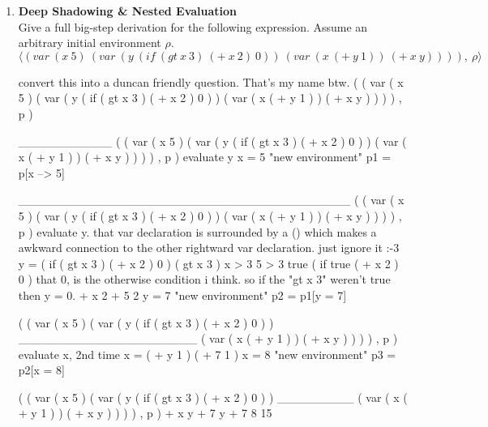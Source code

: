 \documentclass[11pt]{article}
\begin{document}
    \begin{enumerate}
        \item \textbf{Deep Shadowing \& Nested Evaluation} \\
        Give a full big-step derivation for the following expression. Assume an arbitrary initial environment $\rho$.
        \[
            \langle (var\ (x\ 5)\ (var\ (y\ (if\ (gt\ x\ 3)\ (+\ x\ 2)\ 0))\ (var\ (x\ (+\ y\ 1))\ (+\ x\ y)))),\ \rho \rangle
        \]

        \begin{markdown}
            convert this into a duncan friendly question. That's my name btw.
            ( ( var ( x 5 ) ( var ( y ( if ( gt x 3 ) ( + x 2 ) 0 ) )
            ( var ( x ( + y 1 ) ) ( + x y ) ) ) ) , p )

            ___________
            ( ( var ( x 5 ) ( var ( y ( if ( gt x 3 ) ( + x 2 ) 0 ) )
            ( var ( x ( + y 1 ) ) ( + x y ) ) ) ) , p )
            evaluate y
            x = 5
            "new environment"
            p1 = p[x --> 5]

            _______________________________________
            ( ( var ( x 5 ) ( var ( y ( if ( gt x 3 ) ( + x 2 ) 0 ) )
            ( var ( x ( + y 1 ) ) ( + x y ) ) ) ) , p )
            evaluate y.
            that var declaration is surrounded by a () which makes a awkward connection
            to the other rightward var declaration. just ignore it :-3
            y = ( if ( gt x 3 ) ( + x 2 ) 0 )
            ( gt x 3 )
            x > 3
            5 > 3
            true
            ( if true ( + x 2 ) 0 )
            that 0, is the otherwise condition i think.
            so if the "gt x 3" weren't true then y = 0.
            + x 2
            + 5 2
            y = 7
            "new environment"
            p2 = p1[y = 7]












            ( ( var ( x 5 ) ( var ( y ( if ( gt x 3 ) ( + x 2 ) 0 ) )
            _____________________
            ( var ( x ( + y 1 ) ) ( + x y ) ) ) ) , p )
            evaluate x, 2nd time
            x = ( + y 1 )
            ( + 7 1 )
            x = 8
            "new environment"
            p3 = p2[x = 8]

            ( ( var ( x 5 ) ( var ( y ( if ( gt x 3 ) ( + x 2 ) 0 ) )
            _________
            ( var ( x ( + y 1 ) ) ( + x y ) ) ) ) , p )
            + x y
            + 7 y
            + 7 8
            15


\end{markdown}
\end{enumerate}
\end{document}
